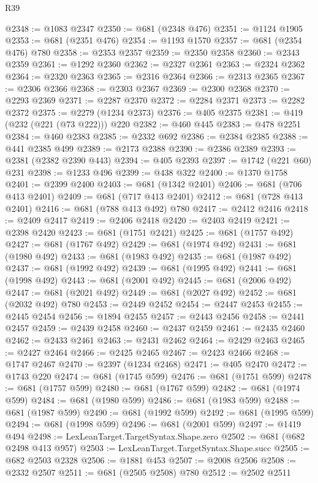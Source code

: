 \begin{lexlean}{R39}
\begin{coremodule}
@2348 := @1083 @2347
@2350 := @681 (@2348 @476)
@2351 := @1124 @1905
@2353 := @681 (@2351 @476)
@2354 := @1193 @1570
@2357 := @681 (@2354 @476) @780
@2358 := @2353 @2357
@2359 := @2350 @2358
@2360 := @2343 @2359
@2361 := @1292 @2360
@2362 := @2327 @2361
@2363 := @2324 @2362
@2364 := @2320 @2363
@2365 := @2316 @2364
@2366 := @2313 @2365
@2367 := @2306 @2366
@2368 := @2303 @2367
@2369 := @2300 @2368
@2370 := @2293 @2369
@2371 := @2287 @2370
@2372 := @2284 @2371
@2373 := @2282 @2372
@2375 := @2279 (@1234 @2373)
@2376 := @405 @2375
@2381 := @419 (@232 (@221 (@73 @222))) @220
@2382 := @460 @445
@2383 := @478 @2251
@2384 := @460 @2383
@2385 := @2332 @692
@2386 := @2384 @2385
@2388 := @441 @2385 @499
@2389 := @2173 @2388
@2390 := @2386 @2389
@2393 := @2381 (@2382 @2390 @443)
@2394 := @405 @2393
@2397 := @1742 (@221 @60) @231
@2398 := @1233 @496
@2399 := @438 @322
@2400 := @1370 @1758
@2401 := @2399 @2400
@2403 := @681 (@1342 @2401)
@2406 := @681 (@706 @413 @2401)
@2409 := @681 (@717 @413 @2401)
@2412 := @681 (@728 @413 @2401)
@2416 := @681 (@788 @413 @492) @780
@2417 := @2412 @2416
@2418 := @2409 @2417
@2419 := @2406 @2418
@2420 := @2403 @2419
@2421 := @2398 @2420
@2423 := @681 (@1751 @2421)
@2425 := @681 (@1757 @492)
@2427 := @681 (@1767 @492)
@2429 := @681 (@1974 @492)
@2431 := @681 (@1980 @492)
@2433 := @681 (@1983 @492)
@2435 := @681 (@1987 @492)
@2437 := @681 (@1992 @492)
@2439 := @681 (@1995 @492)
@2441 := @681 (@1998 @492)
@2443 := @681 (@2001 @492)
@2445 := @681 (@2006 @492)
@2447 := @681 (@2021 @492)
@2449 := @681 (@2027 @492)
@2452 := @681 (@2032 @492) @780
@2453 := @2449 @2452
@2454 := @2447 @2453
@2455 := @2445 @2454
@2456 := @1894 @2455
@2457 := @2443 @2456
@2458 := @2441 @2457
@2459 := @2439 @2458
@2460 := @2437 @2459
@2461 := @2435 @2460
@2462 := @2433 @2461
@2463 := @2431 @2462
@2464 := @2429 @2463
@2465 := @2427 @2464
@2466 := @2425 @2465
@2467 := @2423 @2466
@2468 := @1747 @2467
@2470 := @2397 (@1234 @2468)
@2471 := @405 @2470
@2472 := @1743 @220
@2474 := @681 (@1745 @599)
@2476 := @681 (@1751 @599)
@2478 := @681 (@1757 @599)
@2480 := @681 (@1767 @599)
@2482 := @681 (@1974 @599)
@2484 := @681 (@1980 @599)
@2486 := @681 (@1983 @599)
@2488 := @681 (@1987 @599)
@2490 := @681 (@1992 @599)
@2492 := @681 (@1995 @599)
@2494 := @681 (@1998 @599)
@2496 := @681 (@2001 @599)
@2497 := @1419 @494
@2498 := LexLeanTarget.TargetSyntax.Shape.zero
@2502 := @681 (@682 @2498 @413 @957)
@2503 := LexLeanTarget.TargetSyntax.Shape.succ
@2505 := @682 @2503 @2328
@2506 := @1881 @453
@2507 := @2008 @2506
@2508 := @2332 @2507
@2511 := @681 (@2505 @2508) @780
@2512 := @2502 @2511

\end{coremodule}
\end{lexlean}
